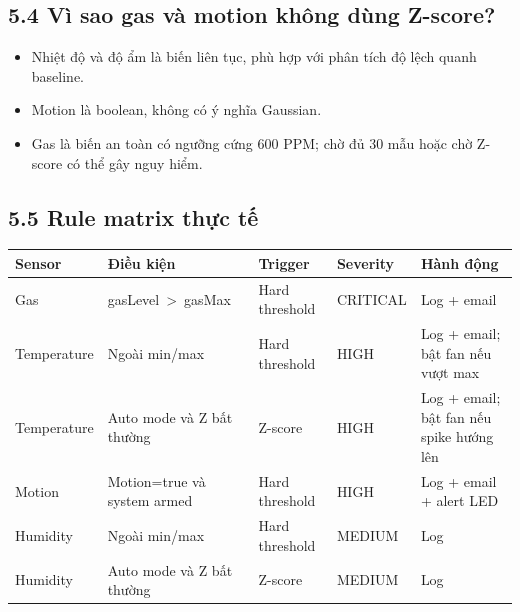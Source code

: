 \documentclass[11pt,oneside,openany]{book}
\newcounter{none}
\renewcommand{\texttt}[1]{{\ttfamily\small #1}}
\let\oldtoprule\toprule
\renewcommand{\toprule}{\arrayrulecolor{Accent}\oldtoprule\arrayrulecolor{RuleColor}}
\providecommand{\tightlist}{\setlength{\itemsep}{1pt}\setlength{\parskip}{0pt}}
\begin{document}
\subsection{5.4 Vì sao gas và motion không dùng
Z-score?}\label{54-vuxec-sao-gas-vuxe0-motion-khuxf4ng-duxf9ng-z-score}

\begin{itemize}
\tightlist
\item
  Nhiệt độ và độ ẩm là biến liên tục, phù hợp với phân tích độ lệch
  quanh baseline.
\item
  Motion là boolean, không có ý nghĩa Gaussian.
\item
  Gas là biến an toàn có ngưỡng cứng 600 PPM; chờ đủ 30 mẫu hoặc chờ
  Z-score có thể gây nguy hiểm.
\end{itemize}

\subsection{5.5 Rule matrix thực
tế}\label{55-rule-matrix-thux1ef1c-tux1ebf}

{\def\LTcaptype{none} %
\begin{longtable}[]{@{}
  >{\raggedright\arraybackslash}p{}
  >{\raggedright\arraybackslash}p{}
  >{\raggedright\arraybackslash}p{}
  >{\raggedright\arraybackslash}p{}
  >{\raggedright\arraybackslash}p{}@{}}
\toprule\noalign{}
\begin{minipage}[b]{\linewidth}\raggedright
Sensor
\end{minipage} & \begin{minipage}[b]{\linewidth}\raggedright
Điều kiện
\end{minipage} & \begin{minipage}[b]{\linewidth}\raggedright
Trigger
\end{minipage} & \begin{minipage}[b]{\linewidth}\raggedright
Severity
\end{minipage} & \begin{minipage}[b]{\linewidth}\raggedright
Hành động
\end{minipage} \\
\midrule\noalign{}
\endhead
\bottomrule\noalign{}
\endlastfoot
Gas & \texttt{gasLevel\ \textgreater{}\ gasMax} & Hard threshold &
CRITICAL & Log + email \\
Temperature & Ngoài min/max & Hard threshold & HIGH & Log + email; bật
fan nếu vượt max \\
Temperature & Auto mode và Z bất thường & Z-score & HIGH & Log + email;
bật fan nếu spike hướng lên \\
Motion & Motion=true và system armed & Hard threshold & HIGH & Log +
email + alert LED \\
Humidity & Ngoài min/max & Hard threshold & MEDIUM & Log \\
Humidity & Auto mode và Z bất thường & Z-score & MEDIUM & Log \\
\end{longtable}
}
\end{document}

